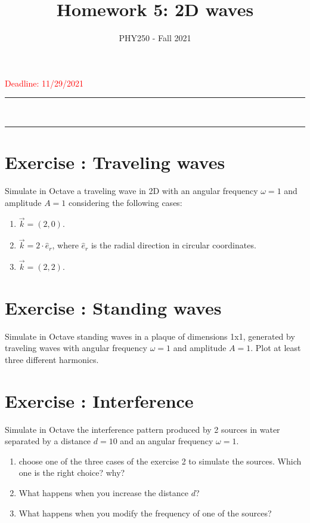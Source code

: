 \documentclass[12pt]{article}
\title{Homework 5: 2D waves}
\author{PHY250 - Fall 2021}
\date{}
\newcommand{\HRule}{\rule{\linewidth}{0.5mm}}
\begin{document}
\maketitle

\textcolor{red}{Deadline: 11/29/2021}

\vspace{5mm}

\begin{spacing}{0.3}
    \noindent
    \HRule\\
    \HRule
\end{spacing}
\vspace{5mm}




\setcounter{example}{1}

\section*{Exercise \theexample: Traveling waves }
Simulate in Octave a traveling wave in 2D  with an angular frequency $\omega=1$ and amplitude $A=1$ considering the following cases:

\begin{enumerate}
  \item $\vec{k}=(2,0)$.
  \item $\vec{k}=2\cdot\hat{e}_r$, where $\hat{e}_r$ is the radial direction in circular coordinates.
  \item $\vec{k}=(2,2)$.
\end{enumerate}





\section*{Exercise \theexample: Standing waves }
Simulate in Octave standing waves in a plaque of dimensions 1x1, generated by traveling waves with angular frequency $\omega=1$ and amplitude $A=1$. Plot at least three different harmonics.





\section*{Exercise \theexample: Interference }
Simulate in Octave the interference pattern produced by 2 sources in water separated by a distance $d=10$ and an angular frequency $\omega=1$.
\begin{enumerate}
  \item choose one of the three cases of the exercise 2 to simulate the sources. Which one is the right choice? why?
  \item What happens when you increase the distance $d$?
  \item What happens when you modify the frequency of one of the sources?
\end{enumerate}
\end{document}
